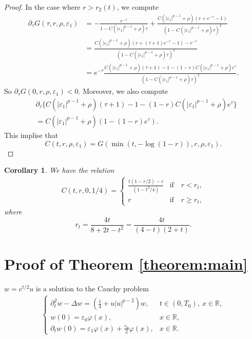 \documentclass[reqno]{amsart}
\newtheorem{Corollary}[Theorem]{Corollary}
\begin{document}
\begin{proof}
In the case where $r > r_2(t)$,
we compute
	\begin{align*}
	\partial_\tau G(\tau,r,\rho, \varepsilon_1)
	&= - \frac{ e^{-\tau}}{1-C ( |\varepsilon_1|^{p-1} + \rho ) \tau}
	+ \frac{ C ( |\varepsilon_1|^{p-1} + \rho ) (r + e^{-\tau} - 1) }{(1-C ( |\varepsilon_1|^{p-1} + \rho ) \tau)^2}\\
	&= \frac{ C ( |\varepsilon_1|^{p-1} + \rho ) (r + ( \tau + 1 ) e^{-\tau} - 1) - e^{-\tau} }{(1-C ( |\varepsilon_1|^{p-1} + \rho ) \tau)^2}\\
	&= e^{-\tau} \frac{ C ( |\varepsilon_1|^{p-1} + \rho ) ( \tau + 1) - 1 - (1-r) C ( |\varepsilon_1|^{p-1} + \rho ) e^\tau }{(1-C ( |\varepsilon_1|^{p-1} + \rho ) \tau)^2}.
	\end{align*}
So $\partial_\tau G(0,r,\rho, \varepsilon_1) < 0$.
Moreover, we also compute
	\begin{align*}
	&\partial_\tau \{ C ( |\varepsilon_1|^{p-1} + \rho ) ( \tau + 1) - 1 - (1-r) C ( |\varepsilon_1|^{p-1} + \rho ) e^\tau \}\\
	&= C ( |\varepsilon_1|^{p-1} + \rho ) (1 - (1-r) e^\tau).
	\end{align*}
This implise that
	\[
	C(t,r,\rho, \varepsilon_1) = G(\min(t,- \log(1-r)),r,\rho, \varepsilon_1).
	\]
\end{proof}

\begin{Corollary}\label{c62}
We have the relation
	\begin{align}
	C(t,r,0,1/4) =
	\begin{cases}
	\frac{t(1-r/2)-r }{(1-t^2/4)}
	& \mbox{if} \quad r < r_t,\\
	r
	& \mbox{if} \quad r \geq r_t,
	\end{cases}
	\end{align}
where
	\[
	r_t
	= \frac{4t}{8+2t-t^2}
	= \frac{4t}{(4-t)(2+t)}.
	\]
\end{Corollary}

\section{Proof of Theorem \ref{theorem:main}}
$w = e^{t/2} u$ is a solution to the Cauchy problem
	\begin{align}\label{CPa1}
	\begin{cases}
	\partial_t^2 w - \Delta w = \left(\frac{1}{4} + u|u|^{p-2} \right) w,
	& t \in (0,T_0), \ x \in \mathbb R,\\
	w(0)=\varepsilon_0 \varphi(x),
	& x \in \mathbb R,\\
	\partial_t w(0) =\varepsilon_1\varphi(x)+\frac{\varepsilon_0}{2}\varphi(x),
	& x \in \mathbb R.
	\end{cases}
	\end{align}
	
\end{document}
